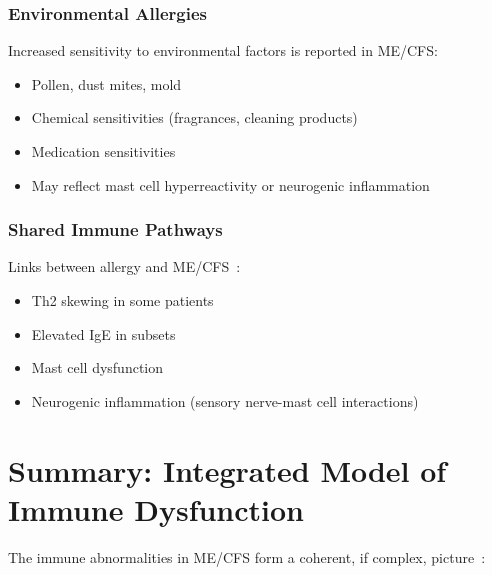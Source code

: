 \subsubsection{Environmental Allergies}

Increased sensitivity to environmental factors is reported in ME/CFS:
\begin{itemize}
    \item Pollen, dust mites, mold
    \item Chemical sensitivities (fragrances, cleaning products)
    \item Medication sensitivities
    \item May reflect mast cell hyperreactivity or neurogenic inflammation~\cite{Wirth2023}
\end{itemize}

\subsubsection{Shared Immune Pathways}

Links between allergy and ME/CFS~\cite{Wirth2023,Frioni2025MCAS}:
\begin{itemize}
    \item Th2 skewing in some patients
    \item Elevated IgE in subsets
    \item Mast cell dysfunction~\cite{Hardcastle2016}
    \item Neurogenic inflammation (sensory nerve-mast cell interactions)
\end{itemize}

\section{Summary: Integrated Model of Immune Dysfunction}
\label{sec:immune-summary}

The immune abnormalities in ME/CFS form a coherent, if complex, picture~\cite{walitt2024deep}:

